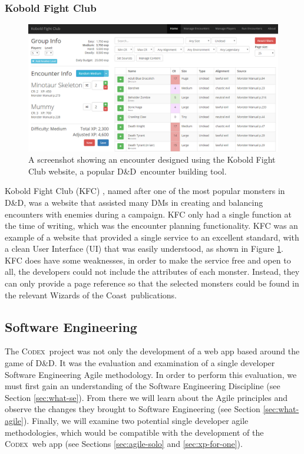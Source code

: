 \documentclass[final]{cmpreport}
\newcommand{\WotC}{Wizards of the Coast}
\newcommand{\dnd}{D\&D}
\newcommand{\Codex}{\textsc{Codex}}
\begin{document}
			\subsubsection{Kobold Fight Club} \label{sec:kfc}
			\begin{figure}
				\centering
				\includegraphics[width=0.8\linewidth]{kfc-screenshot.png}
				\caption[Kobold Fight Club Screenshot]{A screenshot showing an encounter designed using the Kobold Fight Club website, a popular \dnd \ encounter building tool.}\label{fig:kfc}
			\end{figure}
			
			Kobold Fight Club (KFC) \citep{kfc-homepage}, named after one of the most popular monsters in \dnd, was a website that assisted many DMs in creating and balancing encounters with enemies during a campaign. KFC only had a single function at the time of writing, which was the encounter planning functionality. KFC was an example of a website that provided a single service to an excellent standard, with a clean User Interface (UI) that was easily understood, as shown in Figure \ref{fig:kfc}. KFC does have some weaknesses, in order to make the service free and open to all, the developers could not include the attributes of each monster. Instead, they can only provide a page reference so that the selected monsters could be found in the relevant \WotC \ publications.
	
		\subsection{Software Engineering} \label{sec:software-eng}
		The \Codex \ project was not only the development of a web app based around the game of \dnd. It was the evaluation and examination of a single developer Software Engineering Agile methodology. In order to perform this evaluation, we must first gain an understanding of the Software Engineering Discipline (see Section \ref{sec:what-se}). From there we will learn about the Agile principles and observe the changes they brought to Software Engineering (see Section \ref{sec:what-agile}). Finally, we will examine two potential single developer agile methodologies, which would be compatible with the development of the \Codex \ web app (see Sections \ref{sec:agile-solo} and \ref{sec:xp-for-one}). 
			
\end{document}
